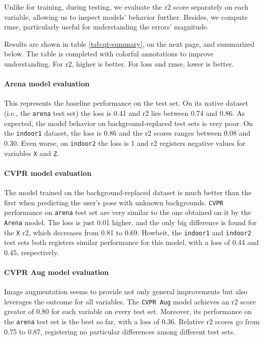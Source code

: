 Unlike for training, during testing, we evaluate the \gls{r2} score separately on each variable, allowing us to inspect models' behavior further. Besides, we compute \gls{rmse}, particularly useful for understanding the errors' magnitude.

Results are shown in table \ref{tab:qt-summary}, on the next page, and summarized below. The table is completed with colorful annotations to improve understanding. For \gls{r2}, higher is better. For loss and \gls{rmse}, lower is better.

\paragraph*{Arena model evaluation}

This represents the baseline performance on the test set. On its native dataset (i.e., the \texttt{arena} test set) the loss is 0.41 and \gls{r2} lies between 0.74 and 0.86. As expected, the model behavior on background-replaced test sets is very poor. On the \texttt{indoor1} dataset, the loss is 0.86 and the \gls{r2} scores ranges between 0.08 and 0.30. Even worse, on \texttt{indoor2} the loss is 1 and \gls{r2} registers negative values for variables \texttt{X} and \texttt{Z}.

\paragraph*{CVPR model evaluation}

The model trained on the background-replaced dataset is much better than the first when predicting the user's pose with unknown backgrounds. \texttt{CVPR} performance on \texttt{arena} test set are very similar to the one obtained on it by the \texttt{Arena} model. The loss is just 0.01 higher, and the only big difference is found for the \texttt{X} \gls{r2}, which decreases from 0.81 to 0.69. Howbeit, the \texttt{indoor1} and \texttt{indoor2} test sets both registers similar performance for this model, with a loss of 0.44 and 0.45, respectively.

\paragraph*{CVPR Aug model evaluation}

Image augmentation seems to provide not only general improvements but also leverages the outcome for all variables. The \texttt{CVPR Aug} model achieves an \gls{r2} score greater of 0.80 for each variable on every test set. Moreover, its performance on the \texttt{arena} test set is the best so far, with a loss of 0.36. Relative \gls{r2} scores go from 0.75 to 0.87, registering no particular differences among different test sets.

